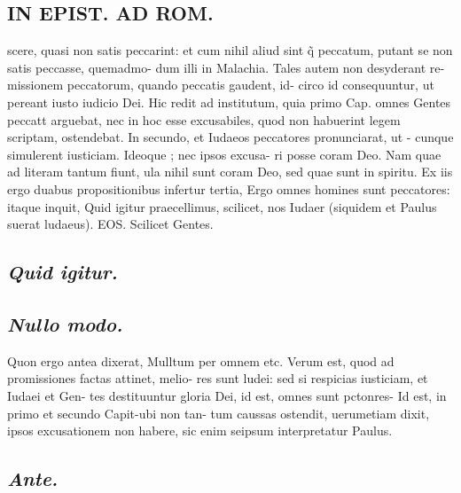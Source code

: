 \documentclass{article}
\begin{document}
\begin{pages}
\section*{ IN EPIST. AD ROM.  }
\marginpar{[ p.]}\pstart scere, quasi non satis peccarint: et cum nihil aliud sint q̃ peccatum, putant se non satis peccasse, quemadmo- dum illi in Malachia. Tales autem non desyderant re- missionem peccatorum, quando peccatis gaudent, id- circo id consequuntur, ut pereant iusto iudicio Dei.   \pend\pstart Hic redit ad institutum, quia primo Cap. omnes Gentes peccatt arguebat, nec in hoc esse excusabiles, quod non habuerint legem scriptam, ostendebat. In secundo, et Iudaeos peccatores pronunciarat, ut - cunque simulerent iusticiam. Ideoque ; nec ipsos excusa- ri posse coram Deo. Nam quae ad literam tantum fiunt, ula nihil sunt coram Deo, sed quae sunt in spiritu. Ex iis ergo duabus propositionibus infertur tertia, Ergo omnes homines sunt peccatores: itaque inquit, Quid igitur praecellimus, scilicet, nos Iudaer (siquidem et Paulus suerat ludaeus). EOS. Scilicet Gentes.   \pend
{}
{}
\subsection*{\textit{Quid igitur. }}
{}
\subsection*{\textit{Nullo modo. }}\pstart Quon ergo antea dixerat, Mulltum per omnem etc.  Verum est, quod ad promissiones factas attinet, melio- res sunt ludei: sed si respicias iusticiam, et Iudaei et Gen- tes destituuntur gloria Dei, id est, omnes sunt pctonres-  \pend\pstart Id est, in primo et secundo Capit-ubi non tan- tum caussas ostendit, uerumetiam dixit, ipsos excusationem non habere, sic enim seipsum interpretatur Paulus.   \pend
{}
{}
\subsection*{\textit{Ante. }}

\end{pages}
\end{document}
